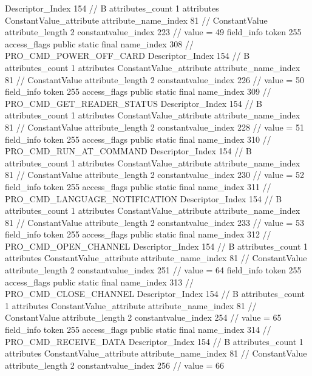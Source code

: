 {{{{{				Descriptor_Index	154		// B
				attributes_count	1
				attributes {
				ConstantValue_attribute {
					attribute_name_index	81		// ConstantValue
					attribute_length	2
					constantvalue_index	223		// value = 49
				}
				}
			}
			field_info {
				token	255
				access_flags	public static final
				name_index	308		// PRO_CMD_POWER_OFF_CARD
				Descriptor_Index	154		// B
				attributes_count	1
				attributes {
				ConstantValue_attribute {
					attribute_name_index	81		// ConstantValue
					attribute_length	2
					constantvalue_index	226		// value = 50
				}
				}
			}
			field_info {
				token	255
				access_flags	public static final
				name_index	309		// PRO_CMD_GET_READER_STATUS
				Descriptor_Index	154		// B
				attributes_count	1
				attributes {
				ConstantValue_attribute {
					attribute_name_index	81		// ConstantValue
					attribute_length	2
					constantvalue_index	228		// value = 51
				}
				}
			}
			field_info {
				token	255
				access_flags	public static final
				name_index	310		// PRO_CMD_RUN_AT_COMMAND
				Descriptor_Index	154		// B
				attributes_count	1
				attributes {
				ConstantValue_attribute {
					attribute_name_index	81		// ConstantValue
					attribute_length	2
					constantvalue_index	230		// value = 52
				}
				}
			}
			field_info {
				token	255
				access_flags	public static final
				name_index	311		// PRO_CMD_LANGUAGE_NOTIFICATION
				Descriptor_Index	154		// B
				attributes_count	1
				attributes {
				ConstantValue_attribute {
					attribute_name_index	81		// ConstantValue
					attribute_length	2
					constantvalue_index	233		// value = 53
				}
				}
			}
			field_info {
				token	255
				access_flags	public static final
				name_index	312		// PRO_CMD_OPEN_CHANNEL
				Descriptor_Index	154		// B
				attributes_count	1
				attributes {
				ConstantValue_attribute {
					attribute_name_index	81		// ConstantValue
					attribute_length	2
					constantvalue_index	251		// value = 64
				}
				}
			}
			field_info {
				token	255
				access_flags	public static final
				name_index	313		// PRO_CMD_CLOSE_CHANNEL
				Descriptor_Index	154		// B
				attributes_count	1
				attributes {
				ConstantValue_attribute {
					attribute_name_index	81		// ConstantValue
					attribute_length	2
					constantvalue_index	254		// value = 65
				}
				}
			}
			field_info {
				token	255
				access_flags	public static final
				name_index	314		// PRO_CMD_RECEIVE_DATA
				Descriptor_Index	154		// B
				attributes_count	1
				attributes {
				ConstantValue_attribute {
					attribute_name_index	81		// ConstantValue
					attribute_length	2
					constantvalue_index	256		// value = 66
}}}}}}}
